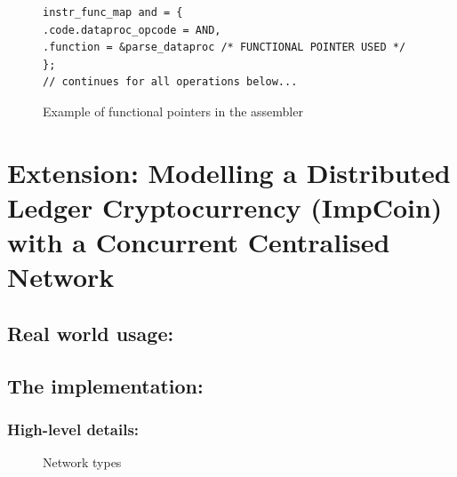 \documentclass[a4paper]{article}
\begin{document}
\begin{figure}[htp]
\centering
\begin{BVerbatim}
instr_func_map and = {
.code.dataproc_opcode = AND,
.function = &parse_dataproc /* FUNCTIONAL POINTER USED */
};
// continues for all operations below...
\end{BVerbatim}
\caption{Example of functional pointers in the assembler}
\label{fig:functional_pointers}
\end{figure}


\section{Extension: Modelling a Distributed Ledger Cryptocurrency (ImpCoin) with a Concurrent Centralised Network}
\subsection{Real world usage:}
\lipsum[1-1]
\subsection{The implementation:}
\subsubsection{High-level details:}
\lipsum[1-1]

\begin{figure}[htp]
    \centering
    \qquad
    \caption{Network types}
    \label{fig:network-types}
\end{figure}
\end{document}
